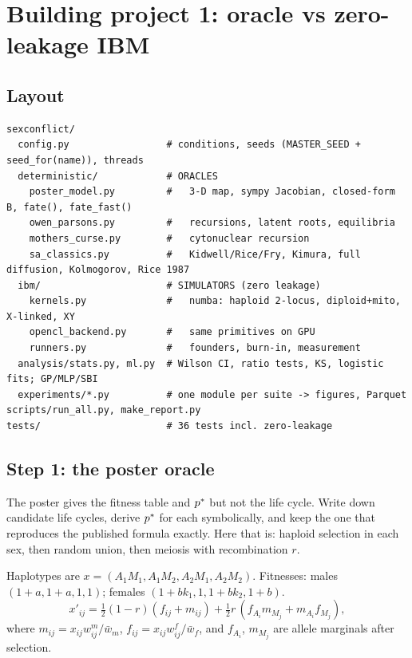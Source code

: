\chapter{Building project 1: oracle vs zero-leakage IBM}\label{ch:build1}

\section{Layout}
\begin{lstlisting}[style=sh]
sexconflict/
  config.py                 # conditions, seeds (MASTER_SEED + seed_for(name)), threads
  deterministic/            # ORACLES
    poster_model.py         #   3-D map, sympy Jacobian, closed-form B, fate(), fate_fast()
    owen_parsons.py         #   recursions, latent roots, equilibria
    mothers_curse.py        #   cytonuclear recursion
    sa_classics.py          #   Kidwell/Rice/Fry, Kimura, full diffusion, Kolmogorov, Rice 1987
  ibm/                      # SIMULATORS (zero leakage)
    kernels.py              #   numba: haploid 2-locus, diploid+mito, X-linked, XY
    opencl_backend.py       #   same primitives on GPU
    runners.py              #   founders, burn-in, measurement
  analysis/stats.py, ml.py  # Wilson CI, ratio tests, KS, logistic fits; GP/MLP/SBI
  experiments/*.py          # one module per suite -> figures, Parquet
scripts/run_all.py, make_report.py
tests/                      # 36 tests incl. zero-leakage
\end{lstlisting}

\section{Step 1: the poster oracle}\label{sec:poster}
\begin{stepbox}
The poster gives the fitness table and $p^{*}$ but not the life cycle. Write down candidate life cycles, derive $p^{*}$ for each symbolically, and keep the one that reproduces the published formula exactly. Here that is: haploid selection in each sex, then random union, then meiosis with recombination $r$.
\end{stepbox}

Haplotypes are $x=(A_1M_1,A_1M_2,A_2M_1,A_2M_2)$. Fitnesses: males $(1+a,1+a,1,1)$; females $(1+bk_1,1,1+bk_2,1+b)$.
\begin{equation}
x'_{ij}=\tfrac12(1-r)(f_{ij}+m_{ij})+\tfrac12 r\,(f_{A_i}m_{M_j}+m_{A_i}f_{M_j}),
\end{equation}
where $m_{ij}=x_{ij}w^m_{ij}/\bar w_m$, $f_{ij}=x_{ij}w^f_{ij}/\bar w_f$, and $f_{A_i}$, $m_{M_j}$ are allele marginals after selection.


